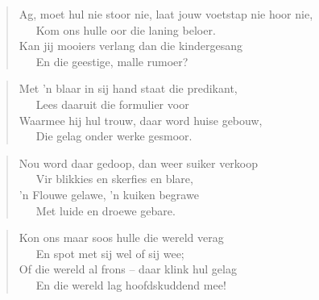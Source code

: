 \begin{verse}
Ag, moet hul nie stoor nie, laat jouw voetstap nie hoor nie, \\ 
\ \ \ Kom ons hulle oor die laning beloer. \\ 
Kan jij mooiers verlang dan die kindergesang \\ 
\ \ \ En die geestige, malle rumoer? \\ 
\end{verse}

\begin{verse}
Met ’n blaar in sij hand staat die predikant, \\ 
\ \ \ Lees daaruit die formulier voor \\ 
Waarmee hij hul trouw, daar word huise gebouw, \\ 
\ \ \ Die gelag onder werke gesmoor. \\ 
\end{verse}

\begin{verse}
Nou word daar gedoop, dan weer suiker verkoop \\ 
\ \ \ Vir blikkies en skerfies en blare, \\ 
’n Flouwe gelawe, ’n kuiken begrawe \\ 
\ \ \ Met luide en droewe gebare. \\ 
\end{verse}

\begin{verse}
Kon ons maar soos hulle die wereld verag \\ 
\ \ \ En spot met sij wel of sij wee; \\ 
Of die wereld al frons -- daar klink hul gelag \\ 
\ \ \ En die wereld lag hoofdskuddend mee! \\ 
\end{verse}